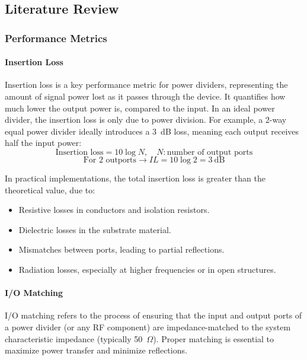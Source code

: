 \subsection{Literature Review}

\subsubsection{Performance Metrics}

\paragraph{Insertion Loss}

Insertion loss is a key performance metric for power dividers, representing the amount of signal power lost as it passes through the device. It quantifies how much lower the output power is, compared to the input. In an ideal power divider, the insertion loss is only due to power division. For example, a 2-way equal power divider ideally introduces a 3~dB loss, meaning each output receives half the input power:
\begin{equation}
\text{Insertion loss} = 10\log N, \quad N: \text{number of output ports}
\end{equation}
\begin{equation}
\text{For 2 outports} \rightarrow IL = 10\log 2 = 3~\text{dB}
\end{equation}

In practical implementations, the total insertion loss is greater than the theoretical value, due to:
\begin{itemize}
    \item Resistive losses in conductors and isolation resistors.
    \item Dielectric losses in the substrate material.
    \item Mismatches between ports, leading to partial reflections.
    \item Radiation losses, especially at higher frequencies or in open structures.
\end{itemize}

\paragraph{I/O Matching}

I/O matching refers to the process of ensuring that the input and output ports of a power divider (or any RF component) are impedance-matched to the system characteristic impedance (typically 50~$\Omega$). Proper matching is essential to maximize power transfer and minimize reflections.


